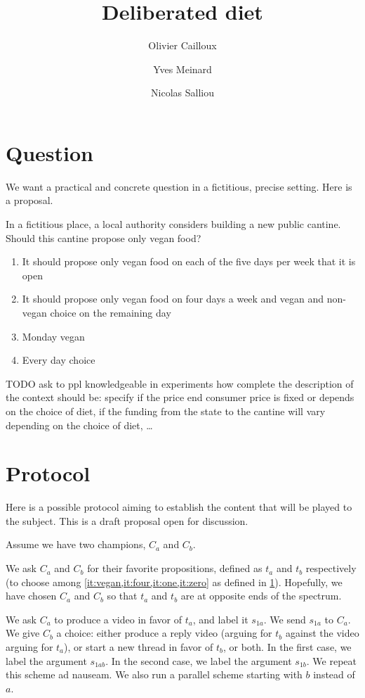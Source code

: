 \documentclass[version=3.21, pagesize, twoside=off, bibliography=totoc, DIV=calc, fontsize=12pt, a4paper]{scrartcl}
\title{Deliberated diet}
\author{Olivier Cailloux}
\author{Yves Meinard}
\affil{Université Paris-Dauphine, PSL Research University, CNRS, LAMSADE, 75016 PARIS, FRANCE}
\author{Nicolas Salliou}
\affil{Affiliation}
\begin{document}
\maketitle

\section{Question}
\label{sec:question}
We want a practical and concrete question in a fictitious, precise setting. Here is a proposal.

In a fictitious place, a local authority considers building a new public cantine. Should this cantine propose only vegan food?
\begin{enumerate}
	\item \label{it:vegan} It should propose only vegan food on each of the five days per week that it is open
	\item \label{it:four} It should propose only vegan food on four days a week and vegan and non-vegan choice on the remaining day
	\item \label{it:one} Monday vegan
	\item \label{it:zero} Every day choice
\end{enumerate}
TODO ask to ppl knowledgeable in experiments how complete the description of the context should be: specify if the price end consumer price is fixed or depends on the choice of diet, if the funding from the state to the cantine will vary depending on the choice of diet, …

\section{Protocol}
\label{sec:prot}
Here is a possible protocol aiming to establish the content that will be played to the subject. This is a draft proposal open for discussion.

Assume we have two champions, $C_a$ and $C_b$.

We ask $C_a$ and $C_b$ for their favorite propositions, defined as $t_a$ and $t_b$ respectively (to choose among \cref{it:vegan,it:four,it:one,it:zero} as defined in \cref{sec:question}). Hopefully, we have chosen $C_a$ and $C_b$ so that $t_a$ and $t_b$ are at opposite ends of the spectrum.

We ask $C_a$ to produce a video in favor of $t_a$, and label it $s_{1a}$. We send $s_{1a}$ to $C_a$. We give $C_b$ a choice: either produce a reply video (arguing for $t_b$ against the video arguing for $t_a$), or start a new thread in favor of $t_b$, or both. In the first case, we label the argument $s_{1ab}$. In the second case, we label the argument $s_{1b}$. We repeat this scheme ad nauseam. We also run a parallel scheme starting with $b$ instead of $a$.
\end{document}
